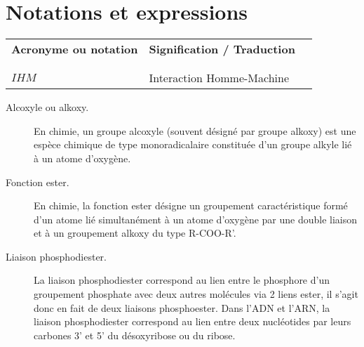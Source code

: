 
\chapter*{Notations et expressions}

\begin{table}[htbp]
\centering
\begin{tabular}{l l l}

\textbf{Acronyme ou notation} & \textbf{Signification / Traduction} & \\ \\ %
\hline
\\

$IHM$ & Interaction Homme-Machine & \\

\end{tabular}
\end{table}

\begin{description}
    \item[Alcoxyle ou alkoxy.] En chimie, un groupe alcoxyle (souvent désigné par groupe alkoxy) est une espèce chimique de type monoradicalaire constituée d'un groupe alkyle lié à un atome d'oxygène.
    \item[Fonction ester.] En chimie, la fonction ester désigne un groupement caractéristique formé d'un atome lié simultanément à un atome d'oxygène par une double liaison et à un groupement alkoxy du type R-COO-R'.
    \item[Liaison phosphodiester.] La liaison phosphodiester correspond au lien entre le phosphore d'un groupement phosphate avec deux autres molécules via 2 liens ester, il s'agit donc en fait de deux liaisons phosphoester. Dans l’ADN et l’ARN, la liaison phosphodiester correspond au lien entre deux nucléotides par leurs carbones 3’ et 5’ du désoxyribose ou du ribose.
\end{description}



